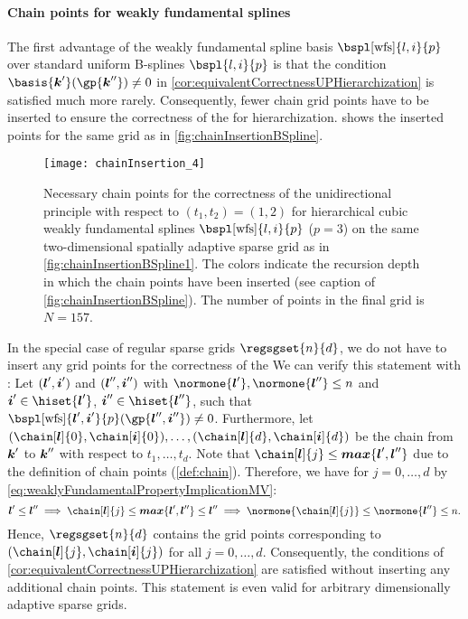 \paragraph{Chain points for weakly fundamental splines}

The first advantage of the
weakly fundamental spline basis $\bspl[\wfs]{l,i}{p}$
over standard uniform B-splines $\bspl{l,i}{p}$ is that
the condition $\basis{\*k'}(\gp{\*k''}) \not= 0$ in
\cref{cor:equivalentCorrectnessUPHierarchization} is
satisfied much more rarely.
Consequently, fewer chain grid points have to be inserted to
ensure the correctness of the \up for hierarchization.
 shows the inserted points
for the same grid as in \cref{fig:chainInsertionBSpline}.

\begin{SCfigure}
  \texttt{[image: chainInsertion\_4]}%
  \caption[%
    Chain points for hierarchical weakly fundamental splines on a
    sparse grid%
  ]{%
    Necessary chain points for the correctness of the unidirectional principle
    with respect to $(t_1, t_2) = (1, 2)$
    for hierarchical cubic weakly fundamental splines
    $\bspl[\wfs]{l,i}{p}$ ($p = 3$)
    on the same two-dimensional spatially adaptive sparse grid
    as in \cref{fig:chainInsertionBSpline1}.
    The colors indicate the recursion depth in which the
    chain points have been inserted
    (see caption of \cref{fig:chainInsertionBSpline}).
    The number of points in the final grid is $N = 157$.%
  }%
  \label{fig:chainInsertionWeaklyFundamentalSpline}%
\end{SCfigure}

In the special case of regular sparse grids $\regsgset{n}{d}$,
we do not have to insert any grid points for the correctness of the
\up{}
We can verify this statement with
:
Let $({\boldsymbol{l}}',{\boldsymbol{i}}')$ and $({\boldsymbol{l}}'',{\boldsymbol{i}}'')$ with
$\normone{\*l'}, \normone{\*l''} \le n$ and
$\*i' \in \hiset{\*l'}$, $\*i'' \in \hiset{\*l''}$,
such that $\bspl[\wfs]{\*l',\*i'}{p}(\gp{\*l'',\*i''}) \not= 0$.
Furthermore, let $(\chain[\*l]{0}, \chain[\*i]{0}), \dotsc,
(\chain[\*l]{d}, \chain[\*i]{d})$ be the chain
from ${\boldsymbol{k}}'$ to ${\boldsymbol{k}}''$ with respect to $t_1, \dotsc, t_d$.
Note that $\chain[\*l]{j} \le \vecmax\{\*l', \*l''\}$ due to the
definition of chain points (\cref{def:chain}).
Therefore, we have for $j = 0, \dotsc, d$
by \eqref{eq:weaklyFundamentalPropertyImplicationMV}:
\begin{equation}
\*l' \le \*l''
\implies
\chain[\*l]{j} \le \vecmax\{\*l', \*l''\} \le \*l''
\implies
\normone{\chain[\*l]{j}} \le \normone{\*l''} \le n.
\end{equation}
Hence, $\regsgset{n}{d}$ contains the grid points corresponding to
$(\chain[\*l]{j}, \chain[\*i]{j})$ for all $j = 0, \dotsc, d$.
Consequently, the conditions of
\cref{cor:equivalentCorrectnessUPHierarchization} are satisfied without
inserting any additional chain points.
This statement is even valid for arbitrary
dimensionally adaptive sparse grids.



